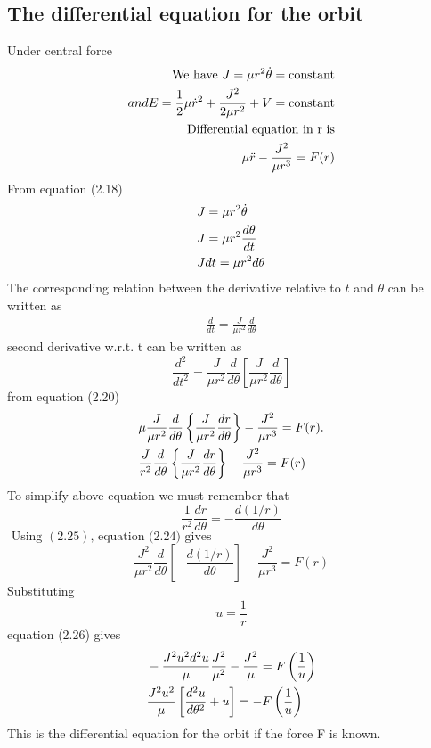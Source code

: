 \subsection{The differential equation for the orbit}
Under central force
\begin{align}
\text{We have }J=\mu r^{2} \dot{\theta}= \text{constant}\\
and E=\frac{1}{2} \mu \dot{r}^{2}+\frac{J^{2}}{2 \mu r^{2}}+V= \text{constant}\\
\text{Differential equation in r is} \notag\\
\mu \ddot{r}-\frac{J^{2}}{\mu r^{3}}=F(r)
\end{align}
From equation (2.18)
\begin{align}
	&J=\mu r^{2} \dot{\theta}\notag  \\
	&J=\mu r^{2} \frac{d \theta}{d t}\notag \\ 
	&J d t=\mu r^{2} d \theta
\end{align}
The corresponding relation between the derivative relative to $t$ and $\theta$ can be written as
\begin{align}
\frac{d}{d t}=\frac{J}{\mu r^{2}} \frac{d}{d \theta}
\end{align}
second derivative w.r.t. t can be written as \\
\begin{equation}
\frac{d^{2}}{d t^{2}}=\frac{J}{\mu r^{2}} \frac{d}{d \theta}\left[\frac{J}{\mu r^{2}} \frac{d}{d \theta}\right]
\end{equation}
from equation (2.20)\\
\begin{align}
	&\mu \frac{J}{\mu r^{2}} \frac{d}{d \theta}\left\{\frac{J}{\mu r^{2}} \frac{d r}{d \theta}\right\}-\frac{J^{2}}{\mu r^{3}}=F(r) . \notag \\
	&\frac{J}{r^{2}} \frac{d}{d \theta}\left\{\frac{J}{\mu r^{2}} \frac{d r}{d \theta}\right\}-\frac{J^{2}}{\mu r^{3}}=F(r)
\end{align}
To simplify above equation we must remember that
\begin{equation}
\frac{1}{r^{2}} \frac{d r}{d \theta}=-\frac{d(1 / r)}{d \theta}
\end{equation}
$\text { Using }(2.25) \text {, equation (2.24) gives }$\\
\begin{equation}
\frac{J^{2}}{\mu r^{2}} \frac{d}{d \theta}\left[-\frac{d(1 / r)}{d \theta}\right]-\frac{J^{2}}{\mu r^{3}}=F(r)
\end{equation}
Substituting
$$
u=\frac{1}{r}
$$
equation (2.26) gives \\
\begin{align}
	&-\frac{J^{2} u^{2} d^{2} u}{\mu} \frac{J^{2}}{\mu^{2}}-\frac{J^{2}}{\mu}=F\left(\frac{1}{u}\right) \notag \\
	&\frac{J^{2} u^{2}}{\mu}\left[\frac{d^{2} u}{d \theta^{2}}+u\right]=-F\left(\frac{1}{u}\right)
\end{align}
This is the differential equation for the orbit if the force F is known.
